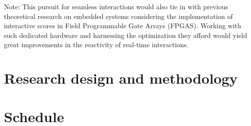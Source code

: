 \documentclass[journal,onecolumn]{IEEEtran}
\begin{document}
Note: This pursuit for seamless interactions would also tie in with previous theoretical research on embedded systems considering the implementation of interactive scores in Field Programmable Gate Arrays (FPGAS)\cite{arias:fpga}. Working with such dedicated hardware and harnessing the optimization they afford would yield great improvements in the reactivity of real-time interactions\cite{popoff:fpga}. 



\section{Research design and methodology} %


\section{Schedule} %
\end{document}
